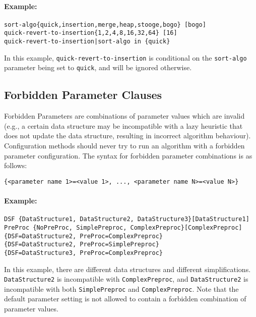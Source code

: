 \documentclass[manual.tex]{subfiles}
\begin{document}
\paragraph{Example:}

\begin{verbatim}
sort-algo{quick,insertion,merge,heap,stooge,bogo} [bogo]
quick-revert-to-insertion{1,2,4,8,16,32,64} [16]
quick-revert-to-insertion|sort-algo in {quick}
\end{verbatim}
In this example, \texttt{quick-revert-to-insertion} is conditional on the \texttt{sort-algo} parameter being set to \texttt{quick}, and will be ignored otherwise.


\subsection{Forbidden Parameter Clauses}

Forbidden Parameters are combinations of parameter values which are invalid (e.g., a certain data structure may be incompatible with a lazy heuristic that does not update the data structure, resulting in incorrect algorithm behaviour).
%
Configuration methods should never try to run an algorithm with a forbidden parameter configuration. 
%
The syntax for forbidden parameter combinations is as follows:

\begin{verbatim}
{<parameter name 1>=<value 1>, ..., <parameter name N>=<value N>}
\end{verbatim}

\paragraph{Example:}
\begin{verbatim}
DSF {DataStructure1, DataStructure2, DataStructure3}[DataStructure1]
PreProc {NoPreProc, SimplePreproc, ComplexPreproc}[ComplexPreproc]
{DSF=DataStructure2, PreProc=ComplexPreproc}
{DSF=DataStructure2, PreProc=SimplePreproc}
{DSF=DataStructure3, PreProc=ComplexPreproc}
\end{verbatim}

In this example, there are different data structures and different simplifications.
\texttt{DataStructure2} is incompatible with \texttt{ComplexPreproc}, and 
\texttt{DataStructure2} is incompatible with both \texttt{SimplePreproc} and \texttt{ComplexPreproc}.
Note that the default parameter setting is not allowed to contain a forbidden combination of parameter values.
\end{document}
